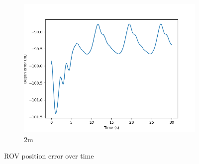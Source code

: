 \documentclass[class=article, crop=false]{standalone}
\begin{document}
\begin{figure}
\begin{subfigure}[b]{0.48\textwidth}
        \centering
        \includegraphics{scenario1/rov-0m/2.0m/rov_depth_error_uncontrolled}
        \caption{2m}
        \label{}
    \end{subfigure}

    \caption{ROV position error over time}
\end{figure}
\end{document}

